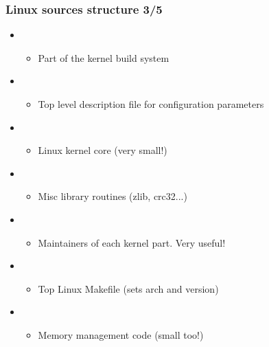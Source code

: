 \begin{frame}
  \frametitle{Linux sources structure 3/5}
  \begin{itemize}
  \item {}
    \begin{itemize}
    \item Part of the kernel build system
    \end{itemize}
  \item {}
    \begin{itemize}
    \item Top level description file for configuration parameters
    \end{itemize}
  \item {}
    \begin{itemize}
    \item Linux kernel core (very small!)
    \end{itemize}
  \item {}
    \begin{itemize}
    \item Misc library routines (zlib, crc32...)
    \end{itemize}
  \item {}
    \begin{itemize}
    \item Maintainers of each kernel part. Very useful!
    \end{itemize}
  \item {}
    \begin{itemize}
    \item Top Linux Makefile (sets arch and version)
    \end{itemize}
  \item {}
    \begin{itemize}
    \item Memory management code (small too!)
    \end{itemize}
  \end{itemize}
\end{frame}

